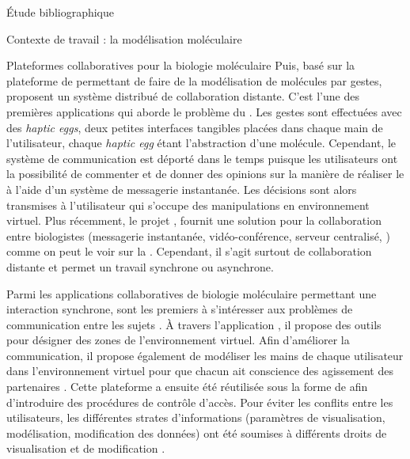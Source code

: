 \documentclass[myfrancais,ngerman,english,french]{mythesis}
\begin{document}
\begin{mychapter}{Étude bibliographique}
\begin{mysection}{Contexte de travail : la modélisation moléculaire}
\begin{mysubsection}{Plateformes collaboratives pour la biologie moléculaire}
				Puis, basé sur la plateforme de  permettant de faire de la modélisation de molécules par gestes,  proposent un système distribué de collaboration distante.
				C'est l'une des premières applications qui aborde le problème du .
				Les gestes sont effectuées avec des \textit{haptic eggs}, deux petites interfaces tangibles placées dans chaque main de l'utilisateur, chaque \textit{haptic egg} étant l'abstraction d'une molécule.
				Cependant, le système de communication est déporté dans le temps puisque les utilisateurs ont la possibilité de commenter et de donner des opinions sur la manière de réaliser le  à l'aide d'un système de messagerie instantanée.
				Les décisions sont alors transmises à l'utilisateur qui s'occupe des manipulations en environnement virtuel.
				Plus récemment, le projet \myeMinerals {}, fournit une solution pour la collaboration entre biologistes (messagerie instantanée, vidéo-conférence, serveur centralisé, \myetc) comme on peut le voir sur la .
				Cependant, il s'agit surtout de collaboration distante et permet un travail synchrone ou asynchrone.

				\begin{myfigure}
				\end{myfigure}

				Parmi les applications collaboratives de biologie moléculaire permettant une interaction synchrone,  sont les premiers à s'intéresser aux problèmes de communication entre les sujets .
				À travers l'application \myAMMPVis, il propose des outils pour désigner des zones de l'environnement virtuel.
				Afin d'améliorer la communication, il propose également de modéliser les mains de chaque utilisateur dans l'environnement virtuel pour que chacun ait conscience des agissement des partenaires .
				Cette plateforme a ensuite été réutilisée sous la forme de \myAMMPEXTN afin d'introduire des procédures de contrôle d'accès.
				Pour éviter les conflits entre les utilisateurs, les différentes strates d'informations (paramètres de visualisation, modélisation, modification des données) ont été soumises à différents droits de visualisation et de modification .


\end{mysubsection}
\end{mysection}
\end{mychapter}
\end{document}
